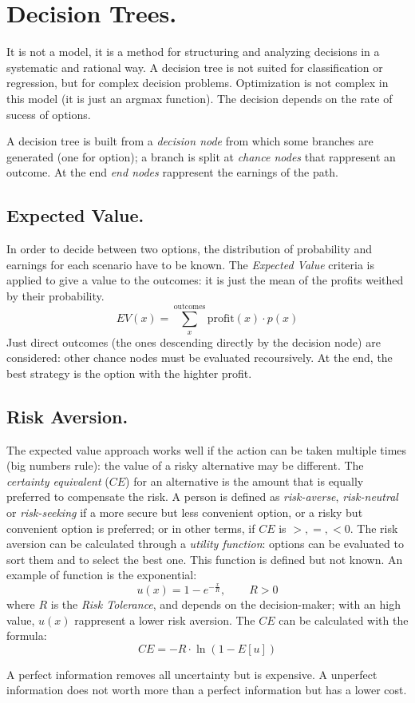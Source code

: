 \documentclass[11pt, twocolumn]{article}
\begin{document}
\section{Decision Trees.}
It is not a model, it is a method for structuring and analyzing decisions in a systematic and rational way.
A decision tree is not suited for classification or regression, but for complex decision problems.
Optimization is not complex in this model (it is just an argmax function).
The decision depends on the rate of sucess of options.

A decision tree is built from a \textit{decision node} from which some branches are generated (one for option); a branch is split at \textit{chance nodes} that rappresent an outcome.
At the end \textit{end nodes} rappresent the earnings of the path.

\subsection{Expected Value.}
In order to decide between two options, the distribution of probability and earnings for each scenario have to be known.
The \textit{Expected Value} criteria is applied to give a value to the outcomes: it is just the mean of the profits weithed by their probability.
\begin{equation*}
  EV (x) = \sum_x^{\text{outcomes}}\text{profit}(x) \cdot p(x)
\end{equation*}
Just direct outcomes (the ones descending directly by the decision node) are considered: other chance nodes must be evaluated recoursively.
At the end, the best strategy is the option with the highter profit.

\subsection{Risk Aversion.}
The expected value approach works well if the action can be taken multiple times (big numbers rule): the value of a risky alternative may be different.
The \textit{certainty equivalent} ($CE$) for an alternative is the amount that is equally preferred to compensate the risk.
A person is defined as \textit{risk-averse}, \textit{risk-neutral} or \textit{risk-seeking} if a more secure but less convenient option, or a risky but convenient option is preferred; or in other terms, if $CE$ is $>, = , < 0$.
The risk aversion can be calculated through a \textit{utility function}: options can be evaluated to sort them and to select the best one.
This function is defined but not known.
An example of function is the exponential:
\begin{equation*}
  u(x) = 1 - e^{-\frac{x}{R}}, \hspace{25pt} R > 0
\end{equation*}
where $R$ is the \textit{Risk Tolerance}, and depends on the decision-maker; with an high value, $u(x)$ rappresent a lower risk aversion.
The $CE$ can be calculated with the formula:
\begin{equation*}
  CE = - R \cdot \ln(1 - E[u])
\end{equation*}

A perfect information removes all uncertainty but is expensive.
A unperfect information does not worth more than a perfect information but has a lower cost.
\end{document}
